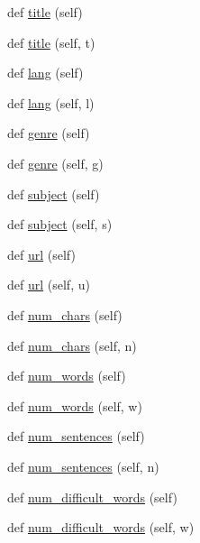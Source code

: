 \begin{DoxyCompactItemize}
\item 
def \mbox{\hyperlink{classbridges_1_1data__src__dependent_1_1book_1_1_book_a62542e66172147fef8100c6acb410934}{title}} (self)
\item 
def \mbox{\hyperlink{classbridges_1_1data__src__dependent_1_1book_1_1_book_a73c839727f5cf9c0a47ca70d84b322b4}{title}} (self, t)
\item 
def \mbox{\hyperlink{classbridges_1_1data__src__dependent_1_1book_1_1_book_ab5c45b128634ba8f6c4e001a0c2dba59}{lang}} (self)
\item 
def \mbox{\hyperlink{classbridges_1_1data__src__dependent_1_1book_1_1_book_a7beb2b850b8278afc1f8bbd97adc9003}{lang}} (self, l)
\item 
def \mbox{\hyperlink{classbridges_1_1data__src__dependent_1_1book_1_1_book_ad1be24582b2d609dba9aab8723c11e62}{genre}} (self)
\item 
def \mbox{\hyperlink{classbridges_1_1data__src__dependent_1_1book_1_1_book_ad841929b6f2bda9300e0c10a4505be67}{genre}} (self, g)
\item 
def \mbox{\hyperlink{classbridges_1_1data__src__dependent_1_1book_1_1_book_a7d341f7c11e9debad855369b16ca705b}{subject}} (self)
\item 
def \mbox{\hyperlink{classbridges_1_1data__src__dependent_1_1book_1_1_book_a98d8cadf6f5edcad1b08daf63c3d4323}{subject}} (self, s)
\item 
def \mbox{\hyperlink{classbridges_1_1data__src__dependent_1_1book_1_1_book_a22ff8b74af33e50a04d7f017b7cd8012}{url}} (self)
\item 
def \mbox{\hyperlink{classbridges_1_1data__src__dependent_1_1book_1_1_book_a193b108cb73c94087a907e61481618e2}{url}} (self, u)
\item 
def \mbox{\hyperlink{classbridges_1_1data__src__dependent_1_1book_1_1_book_abff11391cd2e9d5e91079cf6ededaf80}{num\+\_\+chars}} (self)
\item 
def \mbox{\hyperlink{classbridges_1_1data__src__dependent_1_1book_1_1_book_a025cb07dd0ced8fc21b6d09520b8a53e}{num\+\_\+chars}} (self, n)
\item 
def \mbox{\hyperlink{classbridges_1_1data__src__dependent_1_1book_1_1_book_ac86f9a50d525d837ff89a37065ab0658}{num\+\_\+words}} (self)
\item 
def \mbox{\hyperlink{classbridges_1_1data__src__dependent_1_1book_1_1_book_a4a85170fae3a76808296ff26ff6d98e7}{num\+\_\+words}} (self, w)
\item 
def \mbox{\hyperlink{classbridges_1_1data__src__dependent_1_1book_1_1_book_a930177100f51eeaee0483fc7356cdc9d}{num\+\_\+sentences}} (self)
\item 
def \mbox{\hyperlink{classbridges_1_1data__src__dependent_1_1book_1_1_book_ab346d0ac4ebeada22a4a4960a6fceffd}{num\+\_\+sentences}} (self, n)
\item 
def \mbox{\hyperlink{classbridges_1_1data__src__dependent_1_1book_1_1_book_a4f4cee10b4c7d5178f85ecdcc9851247}{num\+\_\+difficult\+\_\+words}} (self)
\item 
def \mbox{\hyperlink{classbridges_1_1data__src__dependent_1_1book_1_1_book_a20dcb73b736ff00a76e06e7455ec9623}{num\+\_\+difficult\+\_\+words}} (self, w)
\end{DoxyCompactItemize}



